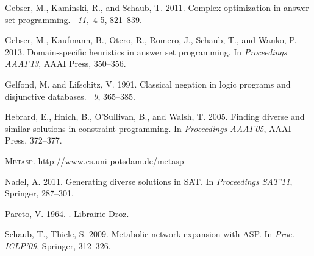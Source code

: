 \begin{thebibliography}{}
{\sc Gebser, M.}, {\sc Kaminski, R.}, {\sc and} {\sc Schaub, T.} 2011.
\newblock Complex optimization in answer set programming.
~{\em 11,\/}~4-5, 821--839.

{\sc Gebser, M.}, {\sc Kaufmann, B.}, {\sc Otero, R.}, {\sc Romero, J.}, {\sc Schaub, T.}, {\sc and} {\sc Wanko, P.} 2013.
\newblock Domain-specific heuristics in answer set programming.
\newblock In {\em Proceedings AAAI'13},
AAAI Press, 350--356.

{\sc Gelfond, M.} {\sc and} {\sc Lifschitz, V.} 1991.
\newblock Classical negation in logic programs and disjunctive databases.
~{\em 9}, 365--385.

{\sc Hebrard, E.}, {\sc Hnich, B.}, {\sc O'Sullivan, B.}, {\sc and} {\sc Walsh, T.} 2005.
\newblock Finding diverse and similar solutions in constraint programming.
\newblock In {\em Proceedings AAAI'05},
AAAI Press, 372--377.

\textsc{Metasp}. \url{http://www.cs.uni-potsdam.de/metasp}

{\sc Nadel, A.} 2011.
\newblock Generating diverse solutions in {SAT}.
\newblock In {\em Proceedings SAT'11},
Springer, 287--301.

{\sc Pareto, V.} 1964.
.
\newblock Librairie Droz.

{\sc Schaub, T.},  {\sc Thiele, S.} 2009.
\newblock Metabolic network expansion with {ASP}.
\newblock In {\em Proc. ICLP'09},
Springer, 312--326.


\end{thebibliography}
